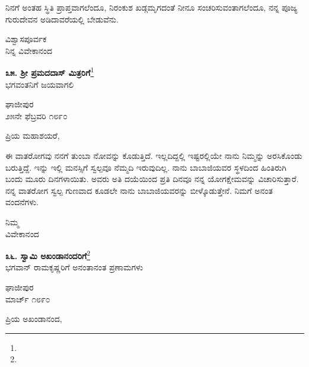 ನಿನಗೆ ಅಂತಹ ಸ್ಥಿತಿ ಪ್ರಾಪ್ತವಾಗಲೆಂದೂ, ನಿರಂಕುಶ ಖಡ್ಗಮೃಗದಂತೆ ನೀನೂ ಸಂಚರಿಸುವಂತಾಗಲೆಂದೂ, ನನ್ನ ಪೂಜ್ಯ ಗುರುದೇವನ ಅಡಿದಾವರೆಯಲ್ಲಿ ಬೇಡುವೆನು.

\vspace{-0.5cm}

{\flushright
ವಿಶ್ವಾಸಪೂರ್ವಕ\\ನಿನ್ನ ವಿವೇಕಾನಂದ\par}

\begin{center}
\textbf{೩೫. ಶ‍್ರೀ ಪ್ರಮದದಾಸ್ ಮಿತ್ರರಿಗೆ}\footnote{}\\ ಭಗವಂತನಿಗೆ ಜಯವಾಗಲಿ
\end{center}

\vspace{-0.6cm}

\begin{flushright}
ಘಾಜೀಪುರ\\ ೨೫ನೇ ಫೆಬ್ರವರಿ ೧೮೯೦
\end{flushright}

\noindent
ಪ್ರಿಯ ಮಹಾಶಯರೆ,

ಈ ವಾತರೋಗವು ನನಗೆ ತುಂಬಾ ನೋವನ್ನು ಕೊಡುತ್ತಿದೆ. ಇಲ್ಲದಿದ್ದಲ್ಲಿ ಇಷ್ಟರಲ್ಲಿಯೇ ನಾನು ನಿಮ್ಮನ್ನು ಅರಸಿಕೊಂಡು ಬರುತ್ತಿದ್ದೆ. ಇನ್ನು ಇಲ್ಲಿ ಮನಸ್ಸಿಗೆ ಸ್ವಲ್ಪವೂ ನೆಮ್ಮದಿ ಇರುವುದಿಲ್ಲ. ನಾನು ಬಾಬಾಜಿಯವರ ಸ್ಥಳದಿಂದ ಹಿಂತಿರುಗಿ ಬಂದು ಮೂರು ದಿನಗಳಾಯಿತು. ಅವರು ಅತಿ ದಯೆಯಿಂದ ಪ್ರತಿ ದಿನವೂ ನನ್ನ ಯೋಗಕ್ಷೇಮವನ್ನು ವಿಚಾರಿಸುತ್ತಾರೆ. ನನ್ನ ವಾತರೋಗ ಸ್ವಲ್ಪ ಗುಣವಾದ ಕೂಡಲೇ ನಾನು ಬಾಬಾಜಿಯವರನ್ನು ಬೀಳ್ಕೊಡುತ್ತೇನೆ. ನಿಮಗೆ ಅನಂತ ವಂದನೆಗಳು.

\vspace{-0.5cm}

{\flushright
ನಿಮ್ಮ\\ವಿವೇಕಾನಂದ\par}

\begin{center}
\textbf{೩೬. ಸ್ವಾಮಿ ಅಖಂಡಾನಂದರಿಗೆ}\footnote{}\\ ಭಗವಾನ್ ರಾಮಕೃಷ್ಣರಿಗೆ ಅನಂತಾನಂತ ಪ್ರಣಾಮಗಳು
\end{center}

\vspace{-0.6cm}

\begin{flushright}
ಘಾಜೀಪುರ\\ ಮಾರ್ಚ್ ೧೮೯೦
\end{flushright}

\noindent
ಪ್ರಿಯ ಅಖಂಡಾನಂದ,

